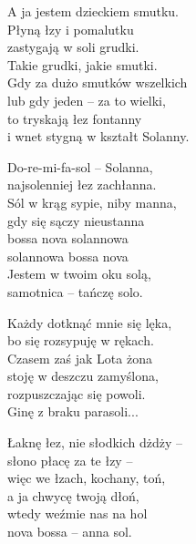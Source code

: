 \begin{text}
    A ja jestem dzieckiem smutku.\\
    Płyną łzy i pomalutku\\
    zastygają w soli grudki.\\
    Takie grudki, jakie smutki.\\
    Gdy za dużo smutków wszelkich\\
    lub gdy jeden – za to wielki,\\
    to tryskają łez fontanny\\
    i wnet stygną w kształt Solanny.

    Do-re-mi-fa-sol – Solanna,\\
    najsolenniej łez zachłanna.\\
    Sól w krąg sypie, niby manna,\\
    gdy się sączy nieustanna\\
    bossa nova solannowa\\
    solannowa bossa nova\\
    Jestem w twoim oku solą,\\
    samotnica – tańczę solo.

    Każdy dotknąć mnie się lęka,\\
    bo się rozsypuję w rękach.\\
    Czasem zaś jak Lota żona\\
    stoję w deszczu zamyślona,\\
    rozpuszczając się powoli.\\
    Ginę z braku parasoli...

    Łaknę łez, nie słodkich dżdży –\\
    słono płacę za te łzy –\\
    więc we łzach, kochany, toń,\\
    a ja chwycę twoją dłoń,\\
    wtedy weźmie nas na hol\\
    nova bossa – anna sol.
\end{text}
\begin{chord}

\end{chord}